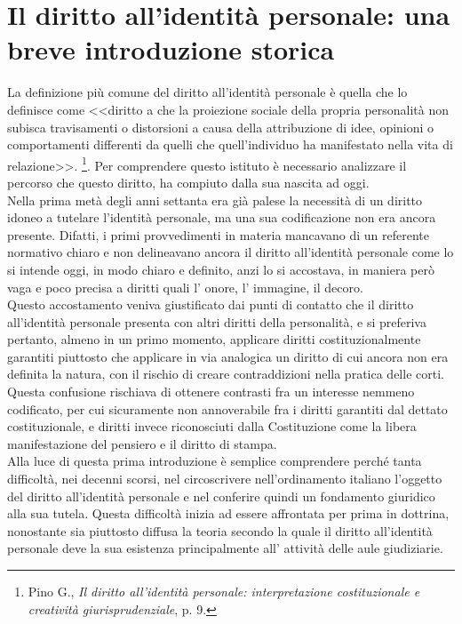 \section{Il diritto all'identità personale: una breve introduzione storica}
La definizione più comune del diritto all'identità personale è quella che lo definisce come <<diritto a che la proiezione sociale della propria personalità non subisca travisamenti
o distorsioni a causa della attribuzione di idee, opinioni o comportamenti differenti da quelli che quell’individuo ha manifestato nella vita di relazione>>. 
\footnote{Pino G.,\textit{ Il diritto all'identità personale: interpretazione costituzionale e creatività giurisprudenziale}, p. 9.}.
Per comprendere questo istituto è necessario analizzare il percorso che questo diritto,
ha compiuto dalla sua nascita ad oggi.
\\Nella prima metà degli anni settanta era già palese la necessità di un diritto idoneo a tutelare l'identità personale, ma una sua codificazione non era ancora presente. Difatti, i primi provvedimenti in materia mancavano di un referente normativo chiaro e non delineavano ancora il diritto all’identità personale come lo si intende oggi, in modo chiaro e definito, anzi lo si accostava, in maniera però vaga e poco precisa a diritti quali l' onore, l' immagine, il decoro.
\\Questo accostamento veniva giustificato dai punti di contatto che il diritto all'identità personale presenta con altri diritti della personalità, e si preferiva pertanto, almeno in un primo momento, applicare diritti costituzionalmente garantiti piuttosto che applicare in via analogica un diritto di cui ancora non era definita la natura, con il rischio di creare contraddizioni nella pratica delle corti.
Questa confusione rischiava di ottenere contrasti fra un interesse nemmeno codificato, per cui sicuramente non annoverabile fra i diritti garantiti dal dettato costituzionale, e diritti invece riconosciuti dalla Costituzione come la libera manifestazione del pensiero e il diritto di stampa. 
\\Alla luce di questa prima introduzione è semplice comprendere perché tanta difficoltà, nei decenni scorsi, nel circoscrivere nell’ordinamento italiano l’oggetto del diritto all’identità personale e nel conferire quindi un fondamento giuridico alla sua tutela. 
Questa difficoltà inizia ad essere affrontata per prima in dottrina, nonostante sia piuttosto diffusa la teoria secondo la quale il diritto all'identità personale deve la sua esistenza principalmente all' attività delle aule giudiziarie. 
